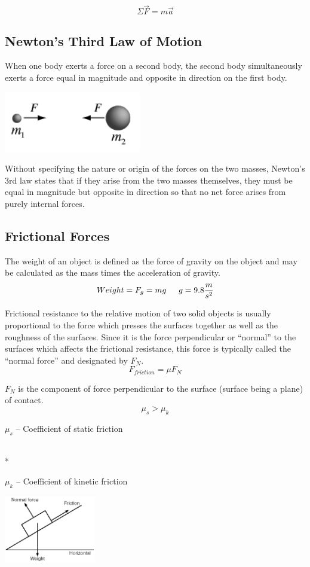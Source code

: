 \documentclass{article}
\begin{document}
  		\[
        	\Sigma\vec{F}=m\vec{a}
        \]
  
  	\subsection{Newton's Third Law of Motion}
  
  		When one body exerts a force on a second body, the second body simultaneously exerts a force equal in magnitude and opposite in direction on the first body.
  		\begin{multicols}{2}
  			\centerline{\includegraphics[width=6cm]{thirdLaw.png}}
  		\columnbreak
  			Without specifying the nature or origin of the forces on the two masses, Newton's 3rd law states that if they arise from the two masses themselves, they must be equal in magnitude but opposite in direction so that no net force arises from purely internal forces.
  		\end{multicols}
  
  	\subsection{Frictional Forces}
  
  		The weight of an object is defined as the force of gravity on the object and may be calculated as the mass times the acceleration of gravity.
  		\[
        	Weight=F_g=mg \indent g=9.8\frac{m}{s^2}
        \]
  
  		Frictional resistance to the relative motion of two solid objects is usually proportional to the force which presses the surfaces together as well as the roughness of the surfaces. Since it is the force perpendicular or ``normal'' to the surfaces which affects the frictional resistance, this force is typically called the ``normal force'' and designated by $F_N$.
  		\[
        	F_{friction}=\mu F_N
        \]
  		\begin{multicols}{2}
  			\noindent$F_N$ is the component of force perpendicular to the surface (surface being a plane) of contact.
  			\[
            	\mu_s>\mu_k
            \]
  			\centerline{$\mu_s$ -- Coefficient of static friction}\\*
  			\centerline{$\mu_k$ -- Coefficient of kinetic friction}
  		\columnbreak
  			\centerline{\includegraphics[width=4cm]{normalForce.png}}
  		\end{multicols}
  
\end{document}
